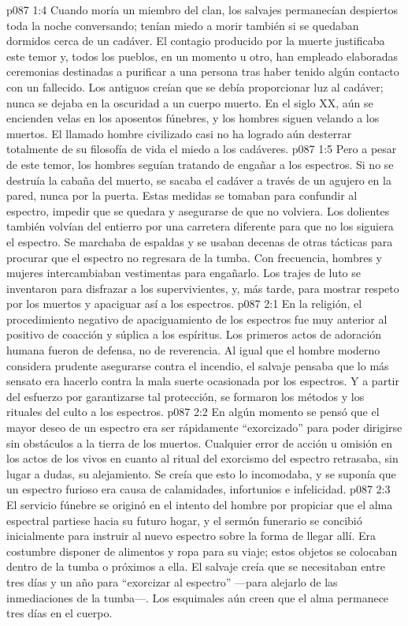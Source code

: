 \vs p087 1:4 Cuando moría un miembro del clan, los salvajes permanecían despiertos toda la noche conversando; tenían miedo a morir también si se quedaban dormidos cerca de un cadáver. El contagio producido por la muerte justificaba este temor y, todos los pueblos, en un momento u otro, han empleado elaboradas ceremonias destinadas a purificar a una persona tras haber tenido algún contacto con un fallecido. Los antiguos creían que se debía proporcionar luz al cadáver; nunca se dejaba en la oscuridad a un cuerpo muerto. En el siglo XX, aún se encienden velas en los aposentos fúnebres, y los hombres siguen velando a los muertos. El llamado hombre civilizado casi no ha logrado aún desterrar totalmente de su filosofía de vida el miedo a los cadáveres.
\vs p087 1:5 Pero a pesar de este temor, los hombres seguían tratando de engañar a los espectros. Si no se destruía la cabaña del muerto, se sacaba el cadáver a través de un agujero en la pared, nunca por la puerta. Estas medidas se tomaban para confundir al espectro, impedir que se quedara y asegurarse de que no volviera. Los dolientes también volvían del entierro por una carretera diferente para que no los siguiera el espectro. Se marchaba de espaldas y se usaban decenas de otras tácticas para procurar que el espectro no regresara de la tumba. Con frecuencia, hombres y mujeres intercambiaban vestimentas para engañarlo. Los trajes de luto se inventaron para disfrazar a los supervivientes, y, más tarde, para mostrar respeto por los muertos y apaciguar así a los espectros.
\vs p087 2:1 En la religión, el procedimiento negativo de apaciguamiento de los espectros fue muy anterior al positivo de coacción y súplica a los espíritus. Los primeros actos de adoración humana fueron de defensa, no de reverencia. Al igual que el hombre moderno considera prudente asegurarse contra el incendio, el salvaje pensaba que lo más sensato era hacerlo contra la mala suerte ocasionada por los espectros. Y a partir del esfuerzo por garantizarse tal protección, se formaron los métodos y los rituales del culto a los espectros.
\vs p087 2:2 \pc En algún momento se pensó que el mayor deseo de un espectro era ser rápidamente “exorcizado” para poder dirigirse sin obstáculos a la tierra de los muertos. Cualquier error de acción u omisión en los actos de los vivos en cuanto al ritual del exorcismo del espectro retrasaba, sin lugar a dudas, su alejamiento. Se creía que esto lo incomodaba, y se suponía que un espectro furioso era causa de calamidades, infortunios e infelicidad.
\vs p087 2:3 El servicio fúnebre se originó en el intento del hombre por propiciar que el alma espectral partiese hacia su futuro hogar, y el sermón funerario se concibió inicialmente para instruir al nuevo espectro sobre la forma de llegar allí. Era costumbre disponer de alimentos y ropa para su viaje; estos objetos se colocaban dentro de la tumba o próximos a ella. El salvaje creía que se necesitaban entre tres días y un año para “exorcizar al espectro” ---para alejarlo de las inmediaciones de la tumba---. Los esquimales aún creen que el alma permanece tres días en el cuerpo.

